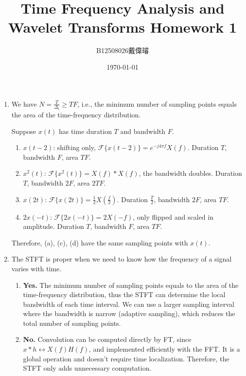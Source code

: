 \documentclass[12pt,a4paper]{article}
\title{Time Frequency Analysis and Wavelet Transforms Homework 1}
\author{B12508026戴偉璿}
\date{\today}
\begin{document}
\maketitle


\begin{enumerate}

\item We have $N=\frac{T}{\Delta_t}\ge TF$, i.e., the minimum number of sampling points equals the area of the time-frequency distribution.

Suppose $x(t)$ has time duration $T$ and bandwidth $F$.

\begin{enumerate}[label=(\alph*)]
  \item $x(t-2)$: shifting only, $\mathcal{F}\{x(t-2)\}=e^{-j4\pi f}X(f)$.
  Duration $T$, bandwidth $F$, area $TF$. 

  \item $x^2(t)$: $\mathcal{F}\{x^2(t)\}=X(f)*X(f)$, the bandwidth doubles.
  Duration $T$, bandwidth $2F$, area $2TF$. 

  \item $x(2t)$: $\mathcal{F}\{x(2t)\}=\frac{1}{2}X\!\left(\frac{f}{2}\right)$.
  Duration $\frac{T}{2}$, bandwidth $2F$, area $TF$.

  \item $2x(-t)$: $\mathcal{F}\{2x(-t)\}=2X(-f)$, only flipped and scaled in amplitude.
  Duration $T$, bandwidth $F$, area $TF$. 
\end{enumerate}

Therefore, (a), (c), (d) have the same sampling points with $x(t)$.


\item The STFT is proper when we need to know how the frequency of a signal varies with time.
\begin{enumerate}[label=(\alph*)]
  \item \textbf{Yes.} The minimum number of sampling points equals to the area of the time-frequency distribution, thus the STFT can determine the local bandwidth of each time interval. We can use a larger sampling interval where the bandwidth is narrow (adaptive sampling), which reduces the total number of sampling points.

  \item \textbf{No.} Convolution can be computed directly by FT, since $x*h \leftrightarrow X(f)H(f)$, and implemented efficiently with the FFT. It is a global operation and doesn't require time localization. Therefore, the STFT only adds unnecessary computation.


\end{enumerate}
\end{enumerate}
\end{document}

